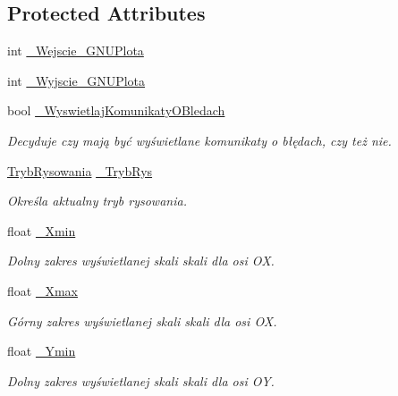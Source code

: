 \subsection*{Protected Attributes}
\begin{DoxyCompactItemize}
\item 
int \hyperlink{class_pz_g_1_1_lacze_do_g_n_u_plota_adc3a2250216c2473a61da379da70b2d7}{\+\_\+\+Wejscie\+\_\+\+G\+N\+U\+Plota}
\item 
int \hyperlink{class_pz_g_1_1_lacze_do_g_n_u_plota_a7d05a4767a35ee494d59724bb740dbc2}{\+\_\+\+Wyjscie\+\_\+\+G\+N\+U\+Plota}
\item 
bool \hyperlink{class_pz_g_1_1_lacze_do_g_n_u_plota_a2f2800f14ebfe1caef0b4d30c410a7fe}{\+\_\+\+Wyswietlaj\+Komunikaty\+O\+Bledach}
\begin{DoxyCompactList}\small\item\em Decyduje czy mają być wyświetlane komunikaty o błędach, czy też nie. \end{DoxyCompactList}\item 
\hyperlink{namespace_pz_g_aeedae1ef10c66d720f9e89de408ca4ca}{Tryb\+Rysowania} \hyperlink{class_pz_g_1_1_lacze_do_g_n_u_plota_a00e3a51bb47d3fb26eee875dc48215db}{\+\_\+\+Tryb\+Rys}
\begin{DoxyCompactList}\small\item\em Określa aktualny tryb rysowania. \end{DoxyCompactList}\item 
float \hyperlink{class_pz_g_1_1_lacze_do_g_n_u_plota_a69d530edfe769e38448972e897456deb}{\+\_\+\+Xmin}
\begin{DoxyCompactList}\small\item\em Dolny zakres wyświetlanej skali skali dla osi {\itshape OX}. \end{DoxyCompactList}\item 
float \hyperlink{class_pz_g_1_1_lacze_do_g_n_u_plota_a847e00678a413ab076ccbcb7eba3ae58}{\+\_\+\+Xmax}
\begin{DoxyCompactList}\small\item\em Górny zakres wyświetlanej skali skali dla osi {\itshape OX}. \end{DoxyCompactList}\item 
float \hyperlink{class_pz_g_1_1_lacze_do_g_n_u_plota_abc555fd6b82b0d5c9efb4802b58dc317}{\+\_\+\+Ymin}
\begin{DoxyCompactList}\small\item\em Dolny zakres wyświetlanej skali skali dla osi {\itshape OY}. \end{DoxyCompactList}\item 

\end{DoxyCompactItemize}
